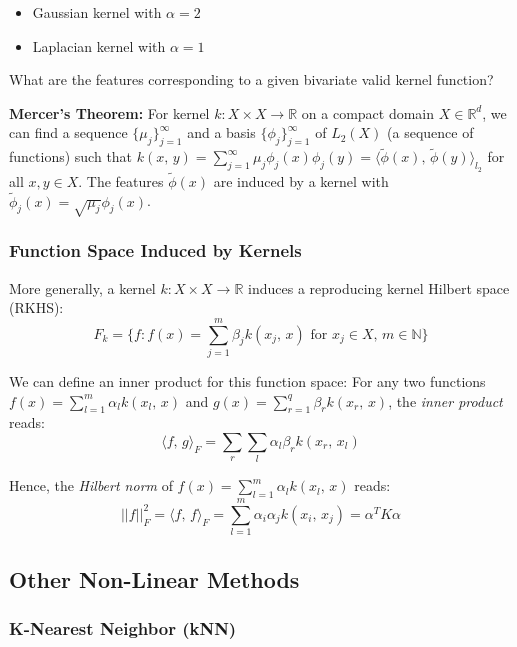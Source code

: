 \documentclass[a4paper]{extarticle}
\begin{document}
\begin{itemize}
    \item Gaussian kernel with $\alpha = 2$
    \item Laplacian kernel with $\alpha = 1$
\end{itemize}

What are the features corresponding to a given bivariate valid kernel function?

\begin{tbox}
    \textbf{Mercer's Theorem:} For kernel $k : X \times X \to \mathbb{R}$ on a compact domain $X \in \mathbb{R}^d$, we can find a sequence $\{\mu_j\}_{j = 1}^{\infty}$ and a basis $\{\phi_j\}_{j = 1}^{\infty}$ of $L_2(X)$ (a sequence of functions) such that $k(x, \, y) = \sum_{j = 1}^{\infty} \mu_j \phi_j(x)\phi_j(y) = \langle \tilde{\phi}(x), \, \tilde{\phi}(y) \rangle_{l_2}$ for all $x,y \in X$. The features $\tilde{\phi}(x)$ are induced by a kernel with $\tilde{\phi}_j(x) = \sqrt{\mu_j}\phi_j(x)$.
\end{tbox}

\subsubsection{Function Space Induced by Kernels}

More generally, a kernel $k : X \times X \to \mathbb{R}$ induces a reproducing kernel Hilbert space (RKHS):
\[
    F_k = \{f : f(x) = \sum_{j = 1}^m \beta_j k(x_j, \, x) \text{ for } x_j \in X, \, m \in \mathbb{N}\}
\]

We can define an inner product for this function space: For any two functions $f(x) = \sum_{l = 1}^m \alpha_l k(x_l, \, x)$ and $g(x) = \sum_{r = 1}^q \beta_r k(x_r, \, x)$, the \textit{inner product} reads:
\[
    \langle f, \, g \rangle_F = \sum_r \sum_l \alpha_l \beta_r k(x_r, \, x_l)
\]

Hence, the \textit{Hilbert norm} of $f(x) = \sum_{l = 1}^m \alpha_l k(x_l, \, x)$ reads:
\[
    ||f||_F^2 = \langle f, \, f \rangle_F = \sum_{l = 1}^m \alpha_i \alpha_j k(x_i, \, x_j) = \alpha^T K \alpha
\]

\subsection{Other Non-Linear Methods}

\subsubsection{K-Nearest Neighbor (kNN)}
\end{document}
